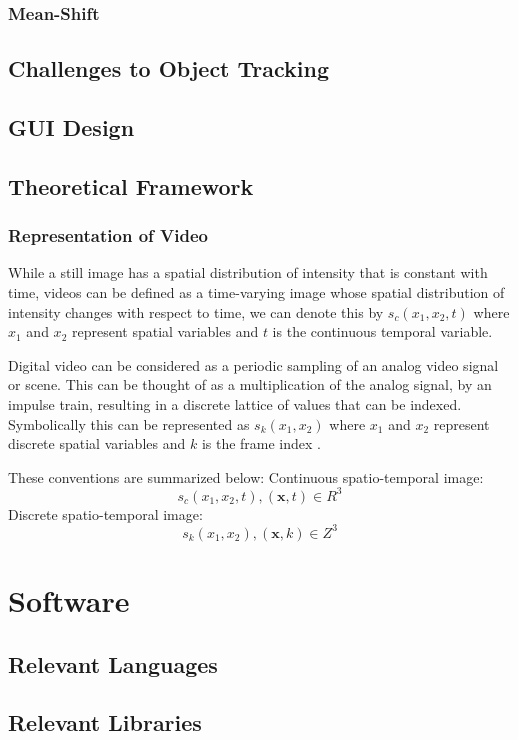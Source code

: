 \subsubsection{Mean-Shift} \label{literature_review_mean_shift}


\subsection{Challenges to Object Tracking}


\subsection{GUI Design}


\subsection{Theoretical Framework}
\subsubsection{Representation of Video}
While a still image has a spatial distribution of intensity that is constant
with time, videos can be defined as a time-varying image whose spatial
distribution of intensity changes with respect to time, we can denote this by
$s_c(x_1,x_2,t)$ where $x_1$ and $x_2$ represent spatial variables and $t$ is
the continuous temporal variable.

Digital video can be considered as a periodic sampling of an analog video signal
or scene. This can be thought of as a multiplication of the analog signal, by an
impulse train, resulting in a discrete lattice of values that can be indexed.
Symbolically this can be represented as $s_k(x_1,x_2)$ where $x_1$ and
$x_2$ represent discrete spatial variables and $k$ is the frame index
\cite{Tekalp2014}. 

These conventions are summarized below: \newline
Continuous spatio-temporal image:
$$s_c(x_1,x_2,t), (\textbf{x},t) \in R^3$$ \newline 
Discrete spatio-temporal image:
$$s_k(x_1,x_2), (\textbf{x},k) \in Z^3$$ 
 

\section{Software}

\subsection{Relevant Languages}

\subsection{Relevant Libraries}




